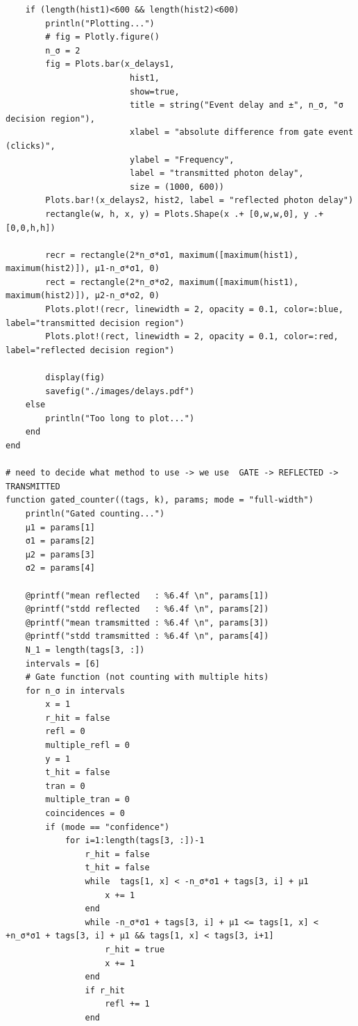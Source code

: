\documentclass[10pt, final]{article}
\begin{document}
\begin{mdframed}
\begin{lstlisting}
    if (length(hist1)<600 && length(hist2)<600)
        println("Plotting...")
        # fig = Plotly.figure()
        n_σ = 2
        fig = Plots.bar(x_delays1,
                         hist1,
                         show=true,
                         title = string("Event delay and ±", n_σ, "σ decision region"),
                         xlabel = "absolute difference from gate event (clicks)",
                         ylabel = "Frequency", 
                         label = "transmitted photon delay", 
                         size = (1000, 600))
        Plots.bar!(x_delays2, hist2, label = "reflected photon delay")
        rectangle(w, h, x, y) = Plots.Shape(x .+ [0,w,w,0], y .+ [0,0,h,h])

        recr = rectangle(2*n_σ*σ1, maximum([maximum(hist1), maximum(hist2)]), μ1-n_σ*σ1, 0)
        rect = rectangle(2*n_σ*σ2, maximum([maximum(hist1), maximum(hist2)]), μ2-n_σ*σ2, 0)
        Plots.plot!(recr, linewidth = 2, opacity = 0.1, color=:blue, label="transmitted decision region")
        Plots.plot!(rect, linewidth = 2, opacity = 0.1, color=:red, label="reflected decision region")

        display(fig)
        savefig("./images/delays.pdf")
    else
        println("Too long to plot...")
    end
end

# need to decide what method to use -> we use  GATE -> REFLECTED -> TRANSMITTED
function gated_counter((tags, k), params; mode = "full-width")
    println("Gated counting...")
    μ1 = params[1]
    σ1 = params[2]
    μ2 = params[3]
    σ2 = params[4]

    @printf("mean reflected   : %6.4f \n", params[1])
    @printf("stdd reflected   : %6.4f \n", params[2])
    @printf("mean tramsmitted : %6.4f \n", params[3])
    @printf("stdd tramsmitted : %6.4f \n", params[4])
    N_1 = length(tags[3, :])
    intervals = [6]
    # Gate function (not counting with multiple hits)
    for n_σ in intervals
        x = 1
        r_hit = false
        refl = 0
        multiple_refl = 0
        y = 1
        t_hit = false
        tran = 0
        multiple_tran = 0
        coincidences = 0
        if (mode == "confidence") 
            for i=1:length(tags[3, :])-1
                r_hit = false
                t_hit = false  
                while  tags[1, x] < -n_σ*σ1 + tags[3, i] + μ1
                    x += 1
                end
                while -n_σ*σ1 + tags[3, i] + μ1 <= tags[1, x] < +n_σ*σ1 + tags[3, i] + μ1 && tags[1, x] < tags[3, i+1] 
                    r_hit = true
                    x += 1
                end
                if r_hit
                    refl += 1
                end


\end{lstlisting}
\end{mdframed}
\end{document}
